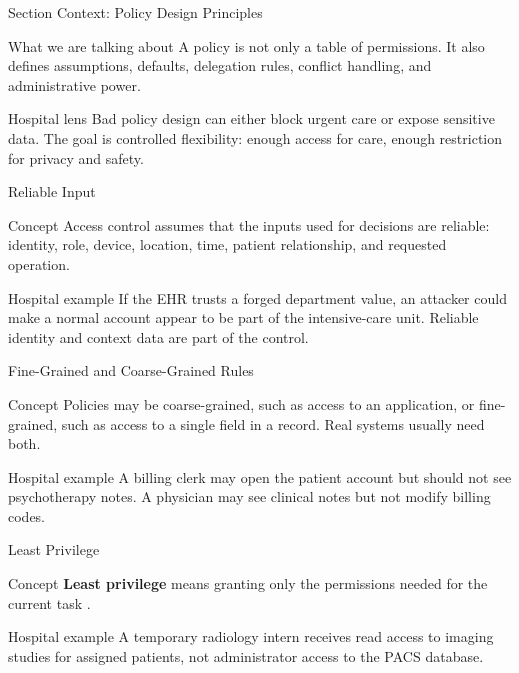 \documentclass[presentation]{beamer}
\begin{document}
\begin{frame}[c]{Section Context: Policy Design Principles}
\begin{block}{What we are talking about}
A policy is not only a table of permissions. It also defines assumptions, defaults, delegation
rules, conflict handling, and administrative power.
\end{block}

\begin{exampleblock}{Hospital lens}
Bad policy design can either block urgent care or expose sensitive data. The goal is controlled
flexibility: enough access for care, enough restriction for privacy and safety.
\end{exampleblock}
\end{frame}

\begin{frame}[c]{Reliable Input}
\begin{block}{Concept}
Access control assumes that the inputs used for decisions are reliable: identity, role, device,
location, time, patient relationship, and requested operation.
\end{block}

\begin{exampleblock}{Hospital example}
If the EHR trusts a forged department value, an attacker could make a normal account appear to be
part of the intensive-care unit. Reliable identity and context data are part of the control.
\end{exampleblock}
\end{frame}

\begin{frame}[c]{Fine-Grained and Coarse-Grained Rules}
\begin{block}{Concept}
Policies may be coarse-grained, such as access to an application, or fine-grained, such as access
to a single field in a record. Real systems usually need both.
\end{block}

\begin{exampleblock}{Hospital example}
A billing clerk may open the patient account but should not see psychotherapy notes. A physician
may see clinical notes but not modify billing codes.
\end{exampleblock}
\end{frame}

\begin{frame}[c]{Least Privilege}
\begin{block}{Concept}
\textbf{Least privilege} means granting only the permissions needed for the current task
\cite{saltzer1975protection}.
\end{block}

\begin{exampleblock}{Hospital example}
A temporary radiology intern receives read access to imaging studies for assigned patients, not
administrator access to the PACS database.
\end{exampleblock}
\end{frame}
\end{document}
